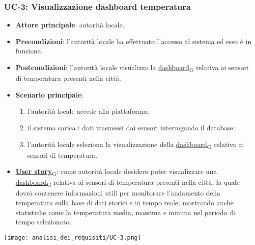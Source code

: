 \subsubsection{UC-3: Visualizzazione dashboard temperatura}
\begin{itemize}
	\item \textbf{Attore principale}: autorità locale.
	\item \textbf{Precondizioni}: l'autorità locale ha effettuato l'accesso al sistema ed esso è in funzione.
	\item \textbf{Postcondizioni}: l'autorità locale visualizza la \href{https://7last.github.io/docs/rtb/documentazione-interna/glossario\#dashboard}{dashboard\textsubscript{G}} relativa
	      ai sensori di temperatura presenti nella città.
	\item \textbf{Scenario principale}:
	      \begin{enumerate}
		      \item l'autorità locale accede alla piattaforma;
		      \item il sistema carica i dati trasmessi dai sensori interrogando il database;
		      \item l'autorità locale seleziona la visualizzazione della \href{https://7last.github.io/docs/rtb/documentazione-interna/glossario\#dashboard}{dashboard\textsubscript{G}} relativa ai sensori di temperatura.
	      \end{enumerate}
	\item \href{https://7last.github.io/docs/rtb/documentazione-interna/glossario\#user-story}{\textbf{User story}\textsubscript{G}}:
	      come autorità locale desidero poter visualizzare una \href{https://7last.github.io/docs/rtb/documentazione-interna/glossario\#dashboard}{dashboard\textsubscript{G}} relativa ai sensori di temperatura presenti nella città, la quale
	      dovrà contenere informazioni utili per monitorare l'andamento della temperatura sulla base di dati storici e in tempo reale, mostrando
	      anche statistiche come la temperatura media, massima e minima nel periodo di tempo selezionato.
\end{itemize}
\begin{center}
	\texttt{[image: analisi\_dei\_requisiti/UC-3.png]}
\end{center}

\newpage

